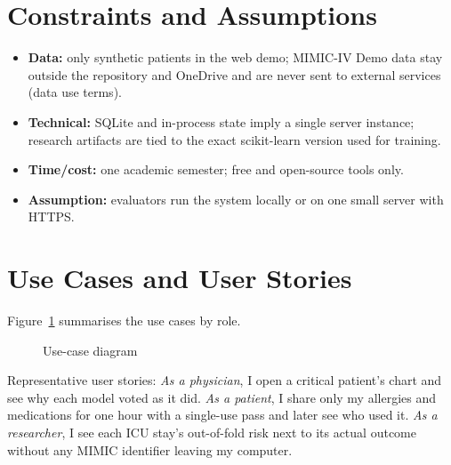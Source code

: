 \section{Constraints and Assumptions}
\begin{itemize}
\item \textbf{Data:} only synthetic patients in the web demo; MIMIC-IV Demo data stay outside the
      repository and OneDrive and are never sent to external services (data use terms).
\item \textbf{Technical:} SQLite and in-process state imply a single server instance; research
      artifacts are tied to the exact scikit-learn version used for training.
\item \textbf{Time/cost:} one academic semester; free and open-source tools only.
\item \textbf{Assumption:} evaluators run the system locally or on one small server with HTTPS.
\end{itemize}

\section{Use Cases and User Stories}
Figure~\ref{fig:usecase} summarises the use cases by role.
\begin{figure}[!htbp]
\centering
{}
\caption{Use-case diagram}
\label{fig:usecase}
\end{figure}
\noindent Representative user stories: \emph{As a physician}, I open a critical patient's chart and see
why each model voted as it did. \emph{As a patient}, I share only my allergies and medications for one
hour with a single-use pass and later see who used it. \emph{As a researcher}, I see each ICU stay's
out-of-fold risk next to its actual outcome without any MIMIC identifier leaving my computer.
